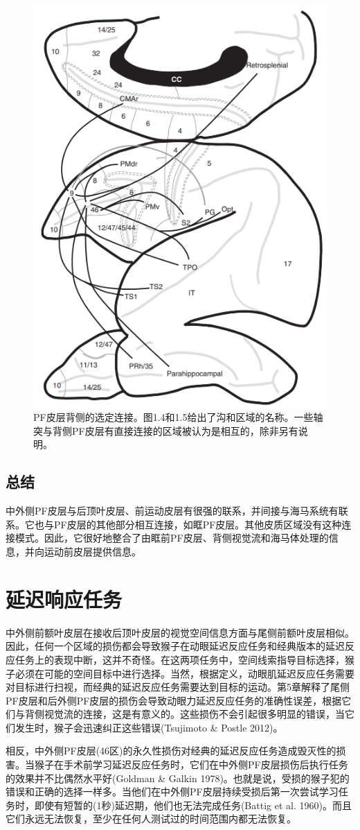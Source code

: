 \begin{figure}
	\centering
	\includegraphics[width=0.5\linewidth]{image_pfc/Fig_6_2}
	\caption{PF皮层背侧的选定连接。图1.4和1.5给出了沟和区域的名称。一些轴突与背侧PF皮层有直接连接的区域被认为是相互的，除非另有说明。}
	\label{fig:fig}
\end{figure}

\subsection{总结}
中外侧PF皮层与后顶叶皮层、前运动皮层有很强的联系，并间接与海马系统有联系。它也与PF皮层的其他部分相互连接，如眶PF皮层。其他皮质区域没有这种连接模式。因此，它很好地整合了由眶前PF皮层、背侧视觉流和海马体处理的信息，并向运动前皮层提供信息。

\section{延迟响应任务}
中外侧前额叶皮层在接收后顶叶皮层的视觉空间信息方面与尾侧前额叶皮层相似。因此，任何一个区域的损伤都会导致猴子在动眼延迟反应任务和经典版本的延迟反应任务上的表现中断，这并不奇怪。在这两项任务中，空间线索指导目标选择，猴子必须在可能的空间目标中进行选择。当然，根据定义，动眼肌延迟反应任务需要对目标进行扫视，而经典的延迟反应任务需要达到目标的运动。第5章解释了尾侧PF皮层和后外侧PF皮层的损伤会导致动眼力延迟反应任务的准确性误差，根据它们与背侧视觉流的连接，这是有意义的。这些损伤不会引起很多明显的错误，当它们发生时，猴子会迅速纠正这些错误(Tsujimoto \& Postle 2012)。

相反，中外侧PF皮层(46区)的永久性损伤对经典的延迟反应任务造成毁灭性的损害。当猴子在手术前学习延迟反应任务时，它们在中外侧PF皮层损伤后执行任务的效果并不比偶然水平好(Goldman \& Galkin 1978)。也就是说，受损的猴子犯的错误和正确的选择一样多。当他们在中外侧PF皮层持续受损后第一次尝试学习任务时，即使有短暂的(1秒)延迟期，他们也无法完成任务(Battig et al. 1960)。而且它们永远无法恢复，至少在任何人测试过的时间范围内都无法恢复。

